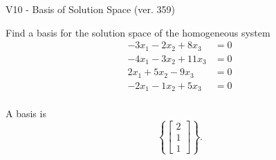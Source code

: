 \begin{exercise}
  \begin{exerciseTitle}V10 - Basis of Solution Space (ver. 359)\end{exerciseTitle}
  \begin{exerciseStatement}
    Find a basis for the solution space of the homogeneous system 
\begin{align*}
 -3 x_ 1 -2 x_ 2 + 8 x_ 3 &= 0  \\ 
  -4 x_ 1 -3 x_ 2 + 11 x_ 3 &= 0  \\ 
  2 x_ 1 + 5 x_ 2 -9 x_ 3 &= 0  \\ 
  -2 x_ 1 -1 x_ 2 + 5 x_ 3 &= 0  \\ 
 \end{align*}


 
  \end{exerciseStatement}

  \begin{exerciseAnswer}
   A basis is   
\[\left\{\left[\begin{array}{c}
2 \\
1 \\
1
\end{array}\right]\right\}.\]

  


  \end{exerciseAnswer}
\end{exercise}